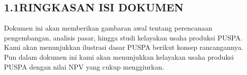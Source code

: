 \subsection*{\textsf{\normalsize 1.1\hspace{0.5cm}RINGKASAN ISI DOKUMEN}}

Dokumen ini akan memberikan gambaran awal tentang perencanaan pengembangan, analisis pasar, hingga studi kelayakan usaha produksi PUSPA. Kami akan menunjukkan ilustrasi dasar PUSPA berikut konsep rancangannya. Pun dalam dokumen ini kami akan menunjukkan kelayakan usaha produksi PUSPA dengan nilai NPV yang cukup menggiurkan.
